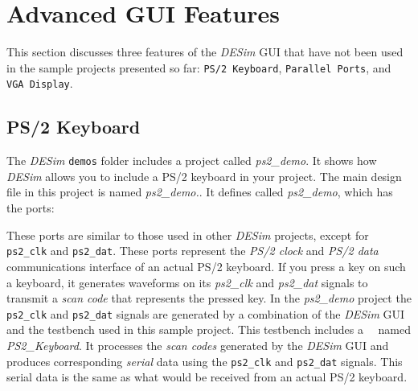 {\section{Advanced GUI Features}
\label{sec:advanced}
This section discusses three features of the {\it DESim} GUI that have not been used in the 
sample projects presented so far: \texttt{PS/2 Keyboard}, \texttt{Parallel Ports}, and 
\texttt{VGA Display}.

\subsection{PS/2 Keyboard}

The {\it DESim} \texttt{demos} folder includes a project called {\it ps2\_demo}. It shows how 
{\it DESim} allows you to include a PS/2 keyboard in your project.  The main design file in 
this project is named 
{\it ps2\_demo.\hdlFileExt }. It defines \fi
called {\it ps2\_demo}, which has the ports:

\vspace{-0.5cm}
\begin{center}
\begin{minipage}[h]{15 cm}
	{}
	{}
\end{minipage}
\end{center}

\vspace{-0.5cm}
These ports are similar to those used in other {\it DESim} projects, except for 
\texttt{ps2\_clk} and \texttt{ps2\_dat}. These ports represent the {\it PS/2 clock} and 
{\it PS/2 data} communications interface of an actual PS/2 keyboard. If you press a key on
such a keyboard, it generates waveforms on its {\it ps2\_clk} and {\it ps2\_dat} signals to 
transmit a {\it scan code} that represents the pressed key. In the {\it ps2\_demo} project 
the \texttt{ps2\_clk} and \texttt{ps2\_dat} signals are generated by a combination of the
{\it DESim} GUI and the testbench used in this sample project. This testbench
includes a \hdlName~\hdlModuleName~named {\it PS2\_Keyboard}. It processes the {\it scan codes}
generated by the {\it DESim} GUI and produces corresponding {\it serial} data using the
\texttt{ps2\_clk} and \texttt{ps2\_dat} signals. This serial data is the same as what
would be received from an actual PS/2 keyboard.

}
